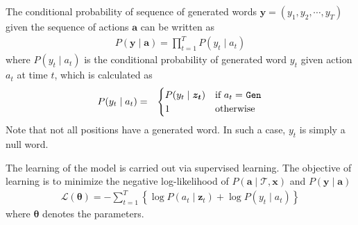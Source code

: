 \documentclass[11pt,a4paper]{article}
\begin{document}
The conditional probability of sequence of generated words $\boldsymbol{y} = (y_1, y_2, \cdots, y_{T})$ given the sequence of actions $\boldsymbol{a}$ can be written as
\begin{align*}
    P(\boldsymbol{y} \mid \boldsymbol{a}) = \prod_{t=1}^{T} P(y_t \mid a_t)
\end{align*}
where $P(y_t \mid a_t)$ is the conditional probability of generated word $y_t$ given action $a_t$ at time $t$, which
is calculated as
\begin{align*}
  &P(y_t \mid a_t) =
    &\begin{cases}
      P(y_t \mid \boldsymbol{z_t}) & \text{if $a_t =\ $\texttt{Gen}} \\
     1 & \text{otherwise}
    \end{cases}       
\end{align*}
Note that not all positions have a generated word. In such a case, $y_t$ is simply a null word.

The learning of the model is carried out via supervised learning. 
The objective of learning is to minimize the negative log-likelihood of $P(\boldsymbol{a}  \mid \mathcal{T}, \boldsymbol{x})$ and $P(\boldsymbol{y} \mid \boldsymbol{a})$
\begin{align*}
    \mathcal{L}(\boldsymbol{\theta}) = - \sum_{t=1}^{T} \left\{ \log P(a_t \mid \boldsymbol{z}_t) + \log P(y_t \mid a_t)\right\}
\end{align*}
where $\boldsymbol{\theta}$ denotes the parameters.
\end{document}
